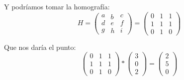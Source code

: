 \documentclass[11pt]{scrartcl} %
\begin{document}
Y podríamos tomar la homografía:
\begin{equation}
	H = 
	\left( 
		\begin{array}{c}a \\ d \\ g\end{array} 
		\begin{array}{c}b \\ e \\ h\end{array} 
		\begin{array}{c}c \\ f \\ i\end{array} 
	\right)
	= 
	\left( 
		\begin{array}{c}0 \\ 1 \\ 0\end{array} 
		\begin{array}{c}1 \\ 1 \\ 1\end{array} 
		\begin{array}{c}1 \\ 1 \\ 0\end{array} 
	\right)
\end{equation}

Que nos daría el punto:
\begin{equation}
	\left( 
		\begin{array}{c}0 \\ 1 \\ 0\end{array} 
		\begin{array}{c}1 \\ 1 \\ 1\end{array} 
		\begin{array}{c}1 \\ 1 \\ 0\end{array} 
	\right) *
	\left( 
		\begin{array}{c}3 \\ 0 \\ 2\end{array} 
	\right)
	=
	\left( 
		\begin{array}{c}2 \\ 5 \\ 0\end{array} 
	\right)
\end{equation}
\end{document}
